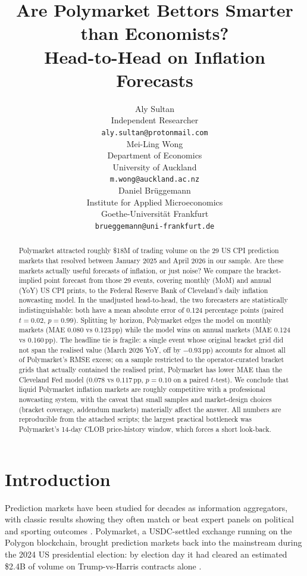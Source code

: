 \documentclass{article}
\title{Are Polymarket Bettors Smarter than Economists?\\
       Head-to-Head on Inflation Forecasts}
\author{%
  Aly Sultan \\
  Independent Researcher \\
  \texttt{aly.sultan@protonmail.com} \\
  \And
  Mei-Ling Wong \\
  Department of Economics \\
  University of Auckland \\
  \texttt{m.wong@auckland.ac.nz} \\
  \And
  Daniel Brüggemann \\
  Institute for Applied Microeconomics \\
  Goethe-Universit\"at Frankfurt \\
  \texttt{brueggemann@uni-frankfurt.de} \\
}
\begin{document}
\maketitle

\begin{abstract}
Polymarket attracted roughly \$18M of trading volume on the 29 US CPI
prediction markets that resolved between January 2025 and April 2026
in our sample.  Are these markets actually useful forecasts of
inflation, or just noise?  We compare the bracket-implied point
forecast from those 29 events, covering monthly (MoM) and annual
(YoY) US CPI prints, to the Federal Reserve Bank of Cleveland's daily
inflation nowcasting model.  In the
unadjusted head-to-head, the two forecasters are statistically
indistinguishable: both have a mean absolute error of 0.124 percentage
points (paired $t = 0.02$, $p = 0.99$).  Splitting by horizon, Polymarket
edges the model on monthly markets (MAE 0.080 vs 0.123\,pp) while the
model wins on annual markets (MAE 0.124 vs 0.160\,pp).  The headline tie
is fragile: a single event whose original bracket grid did not span the
realised value (March 2026 YoY, off by $-0.93$\,pp) accounts for almost
all of Polymarket's RMSE excess; on a sample restricted to the
operator-curated bracket grids that actually contained the realised
print, Polymarket has lower MAE than the Cleveland Fed model
($0.078$ vs $0.117$\,pp, $p = 0.10$ on a paired $t$-test).  We
conclude that liquid Polymarket inflation markets are roughly competitive
with a professional nowcasting system, with the caveat that small
samples and market-design choices (bracket coverage, addendum markets)
materially affect the answer.  All numbers are reproducible from the
attached scripts; the largest practical bottleneck was Polymarket's
14-day CLOB price-history window, which forces a short look-back.
\end{abstract}

\section{Introduction}

Prediction markets have been studied for decades as information
aggregators, with classic results showing they often match or beat
expert panels on political and sporting outcomes
\citep{wolfers2004prediction,arrow2008promise,berg2008election}.
Polymarket, a USDC-settled exchange running on the Polygon
blockchain, brought prediction markets back into the mainstream during
the 2024 US presidential election: by election day it had cleared an
estimated \$2.4B of volume on Trump-vs-Harris contracts alone
\citep{tsang2026polymarket}.
\end{document}
